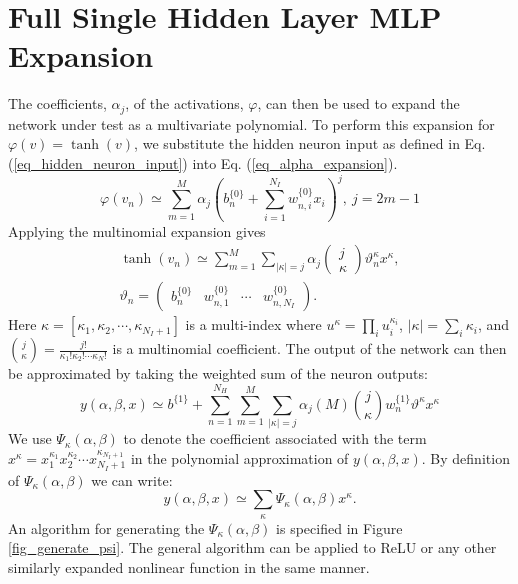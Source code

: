 \section{Full Single Hidden Layer MLP Expansion}
\label{section_full_single_layer_expansion}
The coefficients, $\alpha_j$, of the activations, $\varphi$,
can then be used to expand the network under test
as a multivariate polynomial.  To perform this expansion for $\varphi(v) = \tanh(v)$, we substitute
the hidden neuron input as defined in Eq. (\ref{eq_hidden_neuron_input})
into Eq. (\ref{eq_alpha_expansion}).
\begin{equation}
	\varphi(v_n) \simeq
	\sum_{m = 1}^{M}
	\alpha_j \left(b_n^{\{0\}} + \sum_{i=1}^{N_I} w_{n,i}^{\{0\}}x_i \right)^j,
	\  j = 2m-1
\end{equation}
Applying the multinomial expansion gives
\begin{align}
	\tanh(v_n) \simeq \sum_{m = 1}^{M}
	\sum_{|\kappa|=j} \alpha_j \begin{pmatrix} j \\[-6pt] \kappa \end{pmatrix}
	\vartheta_n^{\kappa} x^{\kappa}, \\
	\vartheta_n = \begin{pmatrix}
		b_n^{\{0\}} & w_{n,1}^{\{0\}} & \cdots & w_{n,N_I}^{\{0\}}
	\end{pmatrix}.
\end{align}
Here
$\kappa =
\left[
\kappa_1, \kappa_2, \cdots, \kappa_{N_I+1}
\right]$
is a multi-index where
$u^\kappa = \prod_{i} u_i^{\kappa_i}$, $|\kappa| = \sum_i \kappa_i$,
and
$\binom{j}{\kappa} = 
\frac{j!}{\kappa_1!\kappa_2! \cdots \kappa_N!}
$
is a multinomial coefficient.  The output of the network can then
be approximated by taking the weighted sum of the neuron outputs:
\begin{equation}
	\label{eq_network_output_full_expansion}
	y(\alpha, \beta, x) \simeq 
	b^{\{1\}} + 
	\sum_{n=1}^{N_H}
	\sum_{m=1}^{M}
	\sum_{|\kappa|=j}
	\alpha_j(M) \binom{j}{\kappa}
	w_n^{\{1\}} \vartheta^{\kappa} x^{\kappa}
\end{equation}
We use $\Psi_{\kappa}(\alpha, \beta)$ to denote the coefficient
associated with the term
$x^{\kappa} =
x_1^{\kappa_1}x_2^{\kappa_2} \cdots x_{N_I+1}^{\kappa_{N_I+1}}
$
in the polynomial approximation of $y(\alpha, \beta, x)$.  By definition
of $\Psi_{\kappa}(\alpha, \beta)$ we can write:
\begin{equation}
	\label{eq_psi_coef_representation}
	y(\alpha, \beta, x) \simeq
	\sum_{\kappa} \Psi_{\kappa}(\alpha, \beta) x^{\kappa}.
\end{equation}
An algorithm for generating the $\Psi_{\kappa}(\alpha, \beta) $ is
specified in Figure \ref{fig_generate_psi}.  The general algorithm can
be applied to ReLU or any other similarly expanded nonlinear function
in the same manner.

